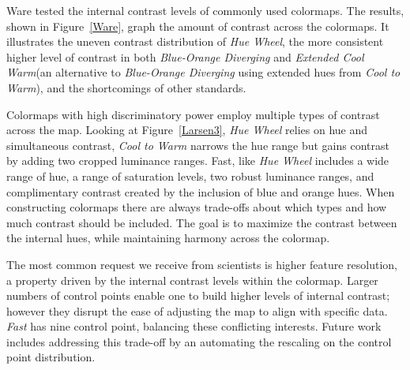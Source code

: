 \documentclass{IEEEcsmag}
\newcommand*{\colormap}[1]{\textsl{#1}\xspace}
\newcommand*{\huewheel}{\colormap{Hue Wheel}}
\newcommand*{\coolwarm}{\colormap{Cool to Warm}}
\newcommand*{\blueorange}{\colormap{Blue-Orange Diverging}}
\newcommand*{\fast}{\colormap{Fast}}
\newcommand*{\extendedcoolwarm}{\colormap{Extended Cool Warm}}
\begin{document}
Ware tested the internal contrast levels of commonly used colormaps.
The results, shown in Figure~\ref{Ware}, graph the amount of contrast across the colormaps.
It illustrates the uneven contrast distribution of \huewheel, the more consistent higher level of contrast in both \blueorange and \extendedcoolwarm (an alternative to \blueorange using extended hues from \coolwarm), and the shortcomings of other standards.



Colormaps with high discriminatory power employ multiple types of contrast across the map.
Looking at Figure~\ref{Larsen3}, \huewheel relies on hue and simultaneous contrast, \coolwarm narrows the hue range but gains contrast by adding two cropped luminance ranges.
Fast, like \huewheel includes a wide range of hue, a range of saturation levels, two robust luminance ranges, and complimentary contrast created by the inclusion of blue and orange hues.
When constructing colormaps there are always trade-offs about which types and how much contrast should be included.
The goal is to maximize the contrast between the internal hues, while maintaining harmony across the colormap.





The most common request we receive from scientists is higher feature resolution, a property driven by the internal contrast levels within the colormap.
Larger numbers of control points enable one to build higher levels of internal contrast; however they disrupt the ease of adjusting the map to align with specific data.
\fast has nine control point, balancing these conflicting interests.
Future work includes addressing this trade-off by an automating the rescaling on the control point distribution.

\end{document}
